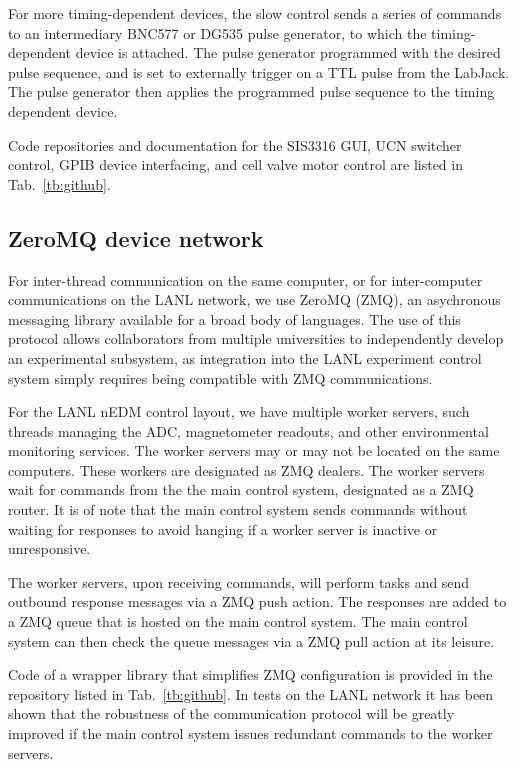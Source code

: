 For more timing-dependent devices, the slow control sends a series of commands to an intermediary BNC577 or DG535 pulse generator, to which the timing-dependent device is attached. The pulse generator programmed with the desired pulse sequence, and is set to externally trigger on a TTL pulse from the LabJack. The pulse generator then applies the programmed pulse sequence to the timing dependent device.

Code repositories and documentation for the SIS3316 GUI, UCN switcher control, GPIB device interfacing, and cell valve motor control are listed in Tab.~\ref{tb:github}.


\subsection{ZeroMQ device network}


For inter-thread communication on the same computer, or for inter-computer communications on the LANL network, we use ZeroMQ (ZMQ), an asychronous messaging library available for a broad body of languages. The use of this protocol allows collaborators from multiple universities to independently develop an experimental subsystem, as integration into the LANL experiment control system simply requires being compatible with ZMQ communications.

For the LANL nEDM control layout, we have multiple worker servers, such threads managing the ADC, magnetometer readouts, and other environmental monitoring services. The worker servers may or may not be located on the same computers. These workers are designated as ZMQ dealers. The worker servers wait for commands from the the main control system, designated as a ZMQ router. It is of note that the main control system sends commands without waiting for responses to avoid hanging if a worker server is inactive or unresponsive.

The worker servers, upon receiving commands, will perform tasks and send outbound response messages via a ZMQ push action. The responses are added to a ZMQ queue that is hosted on the main control system. The main control system can then check the queue messages via a ZMQ pull action at its leisure.

Code of a wrapper library that simplifies ZMQ configuration is provided in the repository listed in Tab.~\ref{tb:github}. In tests on the LANL network it has been shown that the robustness of the communication protocol will be greatly improved if the main control system issues redundant commands to the worker servers.


